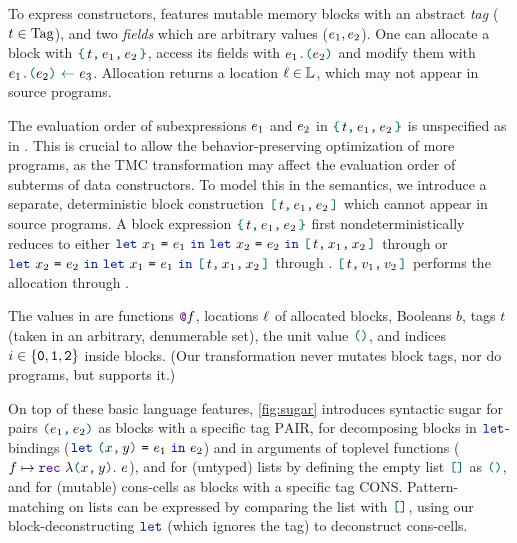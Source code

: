 To express constructors, \DataLang features mutable memory blocks with an abstract \emph{tag} ($\datalangTag \in \datalangTag[]$), and two \emph{fields} which are arbitrary values ($\datalangExpr_1, \datalangExpr_2$).
One can allocate a block with $\datalangBlock{\datalangTag}{\datalangExpr_1}{\datalangExpr_2}$, access its fields with $\datalangLoad{\datalangExpr_1}{\datalangExpr_2}$ and modify them with $\datalangStore{\datalangExpr_1}{\datalangExpr_2}{\datalangExpr_3}$.
Allocation returns a location $\datalangLoc \in \datalangLoc[]$, which may not appear in source programs.

The evaluation order of subexpressions $\datalangExpr_1$ and $\datalangExpr_2$ in $\datalangBlock{\datalangTag}{\datalangExpr_1}{\datalangExpr_2}$ is unspecified as in \OCaml.
This is crucial to allow the behavior-preserving optimization of more programs, as the TMC transformation may affect the evaluation order of subterms of data constructors.
To model this in the semantics, we introduce a separate, deterministic block construction $\datalangBlockDet{\datalangTag}{\datalangExpr_1}{\datalangExpr_2}$ which cannot appear in source programs. A block expression $\datalangBlock{\datalangTag}{\datalangExpr_1}{\datalangExpr_2}$ first nondeterministically reduces to either $\datalangLet{\datalangVar_1}{\datalangExpr_1}{\datalangLet{\datalangVar_2}{\datalangExpr_2}{\datalangBlockDet{\datalangTag}{\datalangVar_1}{\datalangVar_2}}}$ through  or $\datalangLet{\datalangVar_2}{\datalangExpr_2}{\datalangLet{\datalangVar_1}{\datalangExpr_1}{\datalangBlockDet{\datalangTag}{\datalangVar_1}{\datalangVar_2}}}$ through . $\datalangBlockDet{\datalangTag}{\datalangVal_1}{\datalangVal_2}$ performs the allocation through .

The values in \DataLang are functions $\datalangFnptr{\datalangFn}$, locations $\datalangLoc$ of allocated blocks, Booleans $b$, tags $t$ (taken in an arbitrary, denumerable set), the unit value $\datalangUnit$, and indices $i \in \{\texttt{0}, \texttt{1}, \texttt{2}\}$ inside blocks. (Our transformation never mutates block tags, nor do \OCaml programs, but \Mezzo supports it.)

On top of these basic language features, \cref{fig:sugar} introduces syntactic sugar for pairs $\datalangPair {\datalangExpr_1} {\datalangExpr_2}$ as blocks with a specific tag $\mathrm{PAIR}$, for decomposing blocks in $\term{\color{datalangKeyword1}{let}}$-bindings ($\datalangLet {\datalangPair \datalangVar \datalangVarTwo} {\datalangExpr_1} {\datalangExpr_2}$) and in arguments of toplevel functions ($\datalangFn \mapsto \datalangRec {\datalangPair \datalangVar \datalangVarTwo} \datalangExpr$), and for (untyped) lists by defining the empty list $\datalangNil$ as $\datalangUnit$, and for (mutable) cons-cells as blocks with a specific tag $\mathrm{CONS}$. Pattern-matching on lists can be expressed by comparing the list with $\datalangNil$, using our block-deconstructing $\term{\color{datalangKeyword1}{let}}$ (which ignores the tag) to deconstruct cons-cells.


